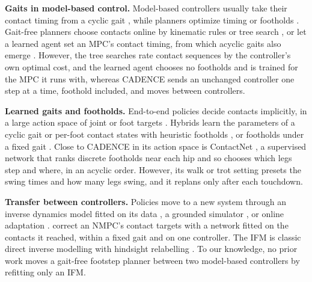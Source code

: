 \vspace{-2em}
\noindent\textbf{Gaits in model-based control.} 
Model-based controllers usually take their contact timing from a cyclic
gait \citep{dicarlo_dynamic_2018, grandia_perceptive_2022}, while
planners optimize timing or footholds \citep{winkler_gait_2018,
jenelten_tamols_2022}. Gait-free planners choose contacts online by
kinematic rules \citep{bjelonic_whole-body_2021} or tree search
\citep{amatucci_monte_2022, taouil_non-gaited_2024}, or let a learned
agent set an MPC's contact timing, from which acyclic gaits also emerge
\citep{patrizi_rl-augmented_2026}. However, the tree searches rate
contact sequences by the controller's own optimal cost, and the learned
agent chooses no footholds and is trained for the MPC it runs with,
whereas CADENCE sends an unchanged controller one step at a time,
foothold included, and moves between controllers.

\noindent\textbf{Learned gaits and footholds.}  End-to-end
policies decide contacts implicitly, in a large action space of joint
or foot targets \citep{lee_learning_2020, zhang_learning_2023}. Hybrids
learn the parameters of a cyclic gait or per-foot contact states with
heuristic footholds \citep{yang_fast_2021, margolis_learning_2021,
da_learning_2020, yang_cajun_2023}, or footholds under a fixed gait
\citep{gangapurwala_rloc_2022, villarreal_fast_2019}. Close to CADENCE
in its action space is ContactNet \citep{bratta_contactnet_2024}, a
supervised network that ranks discrete footholds near each hip and so
chooses which legs step and where, in an acyclic order. However, its
walk or trot setting presets the swing times and how many legs swing,
and it replans only after each touchdown.

\noindent\textbf{Transfer between controllers.}  Policies
move to a new system through an inverse dynamics model fitted on its
data \citep{christiano_transfer_2016, xie_fada_2026}, a grounded
simulator \citep{hanna_grounded_2017}, or online adaptation
\citep{kumar_rma_2021}. \citet{akizhanov_learning_2024} correct an
NMPC's contact targets with a network fitted on the contacts it reached,
within a fixed gait and on one controller. The IFM is classic direct
inverse modelling \citep{jordan_forward_1992} with hindsight relabelling
\citep{andrychowicz_hindsight_2017}. To our knowledge, no prior work
moves a gait-free footstep planner between two model-based controllers
by refitting only an IFM.
